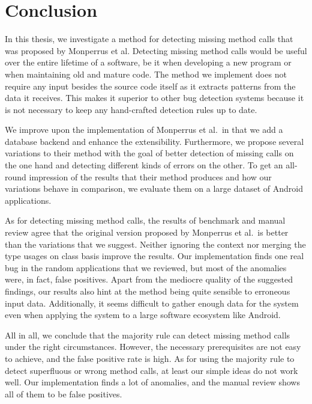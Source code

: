 \chapter{Conclusion}\label{ch:concl}

In this thesis, we investigate a method for detecting missing method calls that was proposed by Monperrus et al.
Detecting missing method calls would be useful over the entire lifetime of a software, be it when developing a new program or when maintaining old and mature code.
The method we implement does not require any input besides the source code itself as it extracts patterns from the data it receives.
This makes it superior to other bug detection systems because it is not necessary to keep any hand-crafted detection rules up to date.

We improve upon the implementation of Monperrus et al.\ in that we add a database backend and enhance the extensibility.
Furthermore, we propose several variations to their method with the goal of better detection of missing calls on the one hand and detecting different kinds of errors on the other.
To get an all-round impression of the results that their method produces and how our variations behave in comparison, we evaluate them on a large dataset of Android applications. 

As for detecting missing method calls, the results of benchmark and manual review agree that the original version proposed by Monperrus et al.\ is better than the variations that we suggest.
Neither ignoring the context nor merging the type usages on class basis improve the results.
Our implementation finds one real bug in the random applications that we reviewed, but most of the anomalies were, in fact, false positives.
Apart from the mediocre quality of the suggested findings, our results also hint at the method being quite sensible to erroneous input data.
Additionally, it seems difficult to gather enough data for the system even when applying the system to a large software ecosystem like Android.

All in all, we conclude that the majority rule can detect missing method calls under the right circumstances.
However, the necessary prerequisites are not easy to achieve, and the false positive rate is high.
As for using the majority rule to detect superfluous or wrong method calls, at least our simple ideas do not work well.
Our implementation finds a lot of anomalies, and the manual review shows all of them to be false positives.

